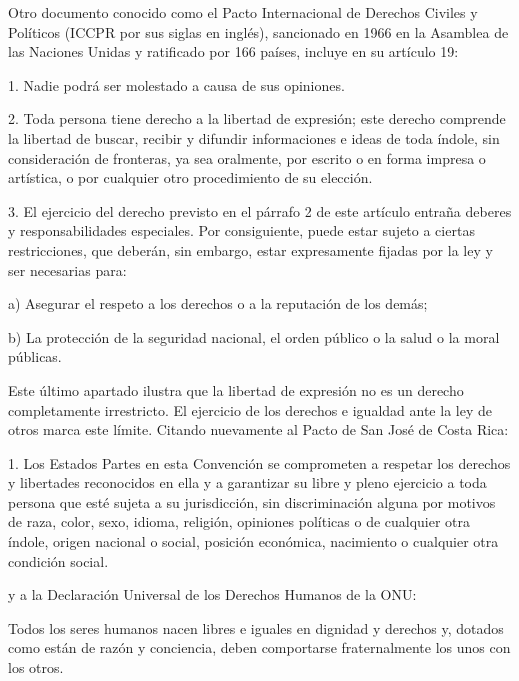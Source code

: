 Otro documento conocido como el Pacto Internacional de Derechos Civiles y Políticos (ICCPR por sus siglas en inglés), sancionado en 1966 en la Asamblea de las Naciones Unidas y ratificado por 166 países, incluye en su artículo 19:

\begin{displayquote}
1. Nadie podrá ser molestado a causa de sus opiniones.

2. Toda persona tiene derecho a la libertad de expresión; este derecho comprende la libertad de buscar, recibir y difundir informaciones e ideas de toda índole, sin consideración de fronteras, ya sea oralmente, por escrito o en forma impresa o artística, o por cualquier otro procedimiento de su elección.

3. El ejercicio del derecho previsto en el párrafo 2 de este artículo entraña deberes y responsabilidades especiales. Por consiguiente, puede estar sujeto a ciertas restricciones, que deberán, sin embargo, estar expresamente fijadas por la ley y ser necesarias para:

a) Asegurar el respeto a los derechos o a la reputación de los demás;

b) La protección de la seguridad nacional, el orden público o la salud o la moral públicas.
\end{displayquote}


Este último apartado ilustra que la libertad de expresión no es un derecho completamente irrestricto. El ejercicio de los derechos e igualdad ante la ley de otros marca este límite. Citando nuevamente al Pacto de San José de Costa Rica:

\begin{displayquote}
    1. Los Estados Partes en esta Convención se comprometen a respetar los derechos y libertades reconocidos en ella y a garantizar su libre y pleno ejercicio a toda persona que esté sujeta a su jurisdicción, sin discriminación alguna por motivos de raza, color, sexo, idioma, religión, opiniones políticas o de cualquier otra índole, origen nacional o social, posición económica, nacimiento o cualquier otra condición social.
\end{displayquote}

y a la Declaración Universal de los Derechos Humanos de la ONU:

\begin{displayquote}
    Todos los seres humanos nacen libres e iguales en dignidad y derechos y, dotados como están de razón y conciencia, deben comportarse fraternalmente los unos con los otros.
\end{displayquote}


